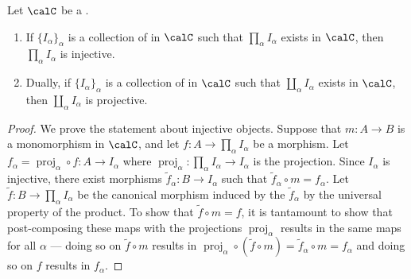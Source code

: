 \begin{lemma} \label{lemma:injective_projective_objects_in_a_category_are_closed_under_products_coproducts}
    Let $\calC$ be a . 
    \begin{enumerate}
        \item If $\{I_\alpha\}_{\alpha}$ is a collection of  in $\calC$ such that $\prod_{\alpha} I_\alpha$ exists in $\calC$, then $\prod_{\alpha} I_\alpha$ is injective.

        \item Dually, if $\{I_\alpha\}_{\alpha}$ is a collection of  in $\calC$ such that $\coprod_{\alpha} I_\alpha$ exists in $\calC$, then $\coprod_{\alpha} I_\alpha$ is projective.
    \end{enumerate}
\end{lemma}
\begin{proof}
    We prove the statement about injective objects. Suppose that $m: A \to B$ is a monomorphism in $\calC$, and let $f: A \to \prod_{\alpha} I_\alpha$ be a morphism. Let $f_\alpha = \operatorname{proj}_\alpha \circ f: A \to I_\alpha$ where $\operatorname{proj}_\alpha: \prod_{\alpha} I_\alpha \to I_\alpha$ is the projection. Since $I_\alpha$ is injective, there exist morphisms $\tilde{f}_\alpha: B \to I_\alpha$ such that $\tilde{f}_\alpha \circ m = f_\alpha$. Let $\tilde{f}: B \to \prod_\alpha I_\alpha$ be the canonical morphism induced by the $\tilde{f}_\alpha$ by the universal property of the product. To show that $\tilde{f} \circ m = f$, it is tantamount to show that post-composing these maps with the projections $\operatorname{proj}_\alpha$ results in the same maps for all $\alpha$ --- doing so on $\tilde{f} \circ m$ results in $\operatorname{proj}_\alpha \circ (\tilde{f} \circ m) = \tilde{f}_\alpha \circ m = f_\alpha$ and doing so on $f$ results in $f_\alpha$.
\end{proof}

